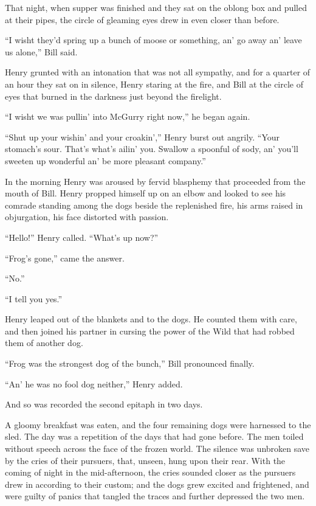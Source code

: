 That night, when supper was finished and they sat on the oblong box and
pulled at their pipes, the circle of gleaming eyes drew in even closer
than before.

“I wisht they’d spring up a bunch of moose or something, an’ go away
an’ leave us alone,” Bill said.

Henry grunted with an intonation that was not all sympathy, and for a
quarter of an hour they sat on in silence, Henry staring at the fire,
and Bill at the circle of eyes that burned in the darkness just beyond
the firelight.

“I wisht we was pullin’ into McGurry right now,” he began again.

“Shut up your wishin’ and your croakin’,” Henry burst out angrily.
“Your stomach’s sour. That’s what’s ailin’ you. Swallow a spoonful of
sody, an’ you’ll sweeten up wonderful an’ be more pleasant company.”

In the morning Henry was aroused by fervid blasphemy that proceeded
from the mouth of Bill. Henry propped himself up on an elbow and looked
to see his comrade standing among the dogs beside the replenished fire,
his arms raised in objurgation, his face distorted with passion.

“Hello!” Henry called. “What’s up now?”

“Frog’s gone,” came the answer.

“No.”

“I tell you yes.”

Henry leaped out of the blankets and to the dogs. He counted them with
care, and then joined his partner in cursing the power of the Wild that
had robbed them of another dog.

“Frog was the strongest dog of the bunch,” Bill pronounced finally.

“An’ he was no fool dog neither,” Henry added.

And so was recorded the second epitaph in two days.

A gloomy breakfast was eaten, and the four remaining dogs were
harnessed to the sled. The day was a repetition of the days that had
gone before. The men toiled without speech across the face of the
frozen world. The silence was unbroken save by the cries of their
pursuers, that, unseen, hung upon their rear. With the coming of night
in the mid-afternoon, the cries sounded closer as the pursuers drew in
according to their custom; and the dogs grew excited and frightened,
and were guilty of panics that tangled the traces and further depressed
the two men.

